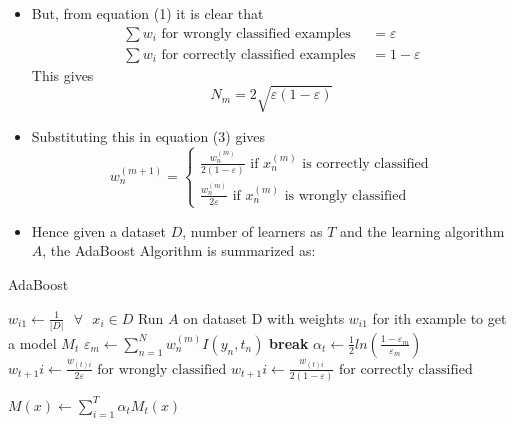 \documentclass{article}
\theoremstyle{plain}
\theoremstyle{definition}
\begin{document}
\begin{itemize}
    \item But, from equation (1) it is clear that 
    \begin{align*}
        \sum w_i \text{ for wrongly classified examples }  &= \varepsilon \\
        \sum w_i \text{ for correctly classified examples } &= 1 - \varepsilon
    \end{align*}
    This gives
    \begin{equation}
        N_m = 2 \sqrt{\varepsilon(1-\varepsilon)}
    \end{equation}
    
    \item Substituting this in equation (3) gives
    \begin{equation}
        w_n^{(m+1)} = \begin{cases}
            \frac{w_n^{(m)}}{2(1-\varepsilon)} \text{ if }x_n^{(m)}\text{ is correctly classified}\\
            \frac{w_n^{(m)}}{2\varepsilon} \text{ if }x_n^{(m)}\text{ is wrongly classified}
        \end{cases}
    \end{equation}
    
    \item Hence given a dataset $D$, number of learners as $T$ and the learning algorithm $A$, the AdaBoost Algorithm is summarized as:
\end{itemize}

\begin{algorithm}
    \caption{AdaBoost}
    \begin{algorithmic}
            \State $w_{i1} \gets \frac{1}{|D|}\text{ }\forall\text{ }x_i\in D$
                \State Run $A$ on dataset D with weights $w_{i1}$ for ith example to get a model $M_t$
                \State $\varepsilon_m \gets \sum\limits_{n=1}^{N} w_n^{(m)} I(y_n, t_n) $
                    \State \textbf{break}
                \EndIf
                \State $\alpha_t \gets \frac{1}{2}ln \left (\frac{1 - \varepsilon_m }{\varepsilon_m} \right )$
                \State $w_{t+1}i \gets \frac{w_{(t)i}}{2\varepsilon} \text{ for wrongly classified}$
                \State $w_{t+1}i \gets \frac{w_{(t)i}}{2(1-\varepsilon)} \text{ for correctly classified}$
            \EndFor
            
            \Return $M(x) \gets \sum_{i=1}^{T} \alpha_t M_t(x)$
        \EndProcedure
    \end{algorithmic}
\end{algorithm}
\end{document}
